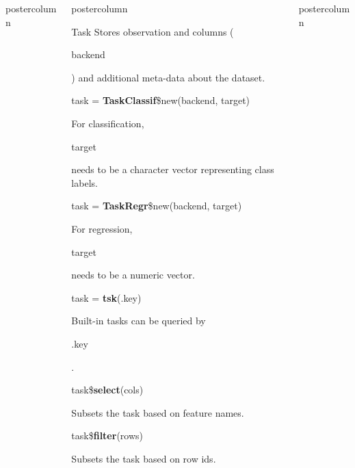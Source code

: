 \documentclass{beamer}
\newlength{\columnheight} %
\newcommand{\codeinline}[1]{\begin{codeboxinline}#1\end{codeboxinline}}
\begin{document}
\begin{frame}[fragile]{}
\begin{columns}
\begin{column}{.245\textwidth}
\begin{beamercolorbox}[center]{postercolumn}
\begin{minipage}{.98\textwidth}
{					}
				\end{minipage}
			\end{beamercolorbox}
		\end{column}
		\begin{column}{.245\textwidth}
			\begin{beamercolorbox}[center]{postercolumn}
				\begin{minipage}{.98\textwidth}
					\parbox[t][\columnheight]{\textwidth}{
					\begin{myblock}{Task}
						Stores observation and columns (\codeinline{backend}) and additional
						meta-data about the dataset.
						\vspace{1em}
						\\
						\begin{codebox}
							task = \textbf{TaskClassif}\$new(backend, target)
						\end{codebox}
						For classification, \codeinline{target} needs to be a character vector representing class labels.
						\\
						\begin{codebox}
							task = \textbf{TaskRegr}\$new(backend, target)
						\end{codebox}
						For regression, \codeinline{target} needs to be a numeric vector.
						\\
						\begin{codebox}
							task = \textbf{tsk}(.key)
						\end{codebox}
						Built-in tasks can be queried by \codeinline{.key}.
						\vspace{1em}
						\\
						\begin{codebox}
							task\$\textbf{select}(cols)
						\end{codebox}
						Subsets the task based on feature names.
						\\
						\begin{codebox}
							task\$\textbf{filter}(rows)
						\end{codebox}
						Subsets the task based on row ids.
					\end{myblock}
					\vfill
					}
				\end{minipage}
			\end{beamercolorbox}
		\end{column}
		\begin{column}{.245\textwidth}
			\begin{beamercolorbox}[center]{postercolumn}
				\begin{minipage}{.98\textwidth}

\end{minipage}
\end{beamercolorbox}
\end{column}
\end{columns}
\end{frame}
\end{document}
